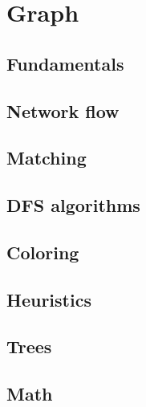 \chapter{Graph}

\section{Fundamentals}

\section{Network flow}

\section{Matching}

\section{DFS algorithms}

\section{Coloring}

\section{Heuristics}

\section{Trees}
\section{Math}
